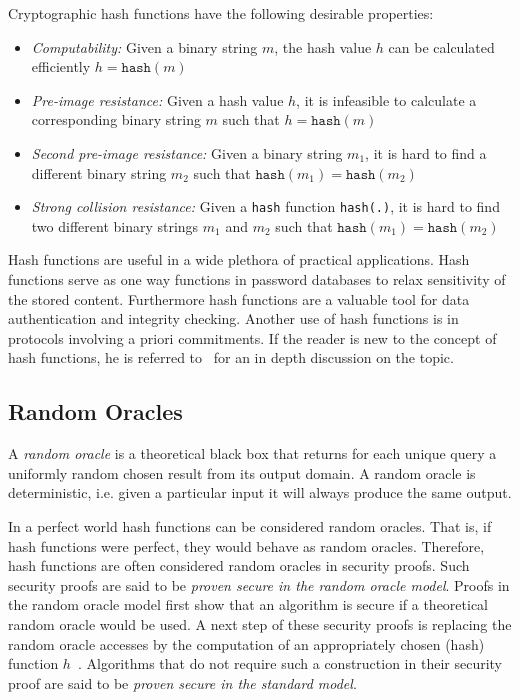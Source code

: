 Cryptographic hash functions have the following desirable properties:
\begin{itemize}
 \item \textit{Computability:} Given a binary string $m$, the hash value $h$ can be calculated efficiently $h = \texttt{hash} \left( m \right)$
 \item \textit{Pre-image resistance:} Given a hash value $h$, it is infeasible to calculate a corresponding binary string $m$ such that $h = \texttt{hash} \left( m \right)$
 \item \textit{Second pre-image resistance:} Given a binary string $m_1$, it is hard to find a different binary string $m_2$ such that $\texttt{hash} \left( m_1 \right) = \texttt{hash} \left( m_2 \right)$
 \item \textit{Strong collision resistance:} Given a \texttt{hash} function \texttt{hash(.)}, it is hard to find two different binary strings $m_1$ and $m_2$ such that $\texttt{hash} \left( m_1 \right) = \texttt{hash} \left( m_2 \right)$
\end{itemize}

Hash functions are useful in a wide plethora of practical applications. Hash functions serve as one way functions in password databases to relax sensitivity of the stored content. Furthermore hash functions are a valuable tool for data authentication and integrity checking. Another use of hash functions is in protocols involving a priori commitments. If the reader is new to the concept of hash functions, he is referred to~\cite{book:handbook_of_applied_cryptography} for an in depth discussion on the topic.

\subsection{Random Oracles}
A \textit{random oracle} is a theoretical black box that returns for each unique query a uniformly random chosen result from its output domain. A random oracle is deterministic, i.e. given a particular input it will always produce the same output.

In a perfect world hash functions can be considered random oracles. That is, if hash functions were perfect, they would behave as random oracles. Therefore, hash functions are often considered random oracles in security proofs. Such security proofs are said to be \textit{proven secure in the random oracle model}. Proofs in the random oracle model first show that an algorithm is secure if a theoretical random oracle would be used. A next step of these security proofs is replacing the random oracle accesses by the computation of an appropriately chosen (hash) function $h$~\cite{art:BellareR93}. Algorithms that do not require such a construction in their security proof are said to be \textit{proven secure in the standard model}.


